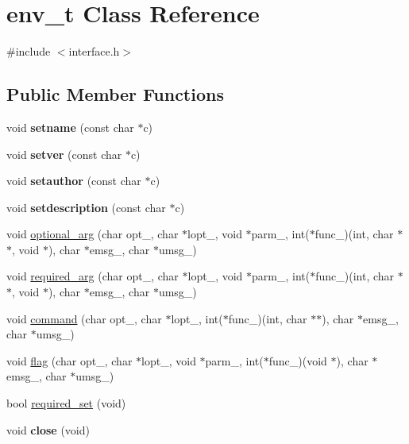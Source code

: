 \hypertarget{classenv__t}{\section{env\-\_\-t Class Reference}
\label{classenv__t}
}


{\ttfamily \#include $<$interface.\-h$>$}

\subsection*{Public Member Functions}
\begin{DoxyCompactItemize}
\item 
\hypertarget{classenv__t_a4a79bfddbd1a307bda6be045e3655c14}{void {\bfseries setname} (const char $\ast$c)}\label{classenv__t_a4a79bfddbd1a307bda6be045e3655c14}

\item 
\hypertarget{classenv__t_a938aa066c5816d3fff2c7ff725af7ab4}{void {\bfseries setver} (const char $\ast$c)}\label{classenv__t_a938aa066c5816d3fff2c7ff725af7ab4}

\item 
\hypertarget{classenv__t_a741fe145876764a54ee00be73ffc0b9b}{void {\bfseries setauthor} (const char $\ast$c)}\label{classenv__t_a741fe145876764a54ee00be73ffc0b9b}

\item 
\hypertarget{classenv__t_aa8248adb6bb538f9db08710cadf41c62}{void {\bfseries setdescription} (const char $\ast$c)}\label{classenv__t_aa8248adb6bb538f9db08710cadf41c62}

\item 
void \hyperlink{classenv__t_a1a0bc45f5fab86f92ec1d9e64865c144}{optional\-\_\-arg} (char opt\-\_\-, char $\ast$lopt\-\_\-, void $\ast$parm\-\_\-, int($\ast$func\-\_\-)(int, char $\ast$$\ast$, void $\ast$), char $\ast$emsg\-\_\-, char $\ast$umsg\-\_\-)
\item 
void \hyperlink{classenv__t_afc6a2cf8967c4396780eccf8e9e3133c}{required\-\_\-arg} (char opt\-\_\-, char $\ast$lopt\-\_\-, void $\ast$parm\-\_\-, int($\ast$func\-\_\-)(int, char $\ast$$\ast$, void $\ast$), char $\ast$emsg\-\_\-, char $\ast$umsg\-\_\-)
\item 
void \hyperlink{classenv__t_a9f3138b6b234353c3167e00f0d19f48d}{command} (char opt\-\_\-, char $\ast$lopt\-\_\-, int($\ast$func\-\_\-)(int, char $\ast$$\ast$), char $\ast$emsg\-\_\-, char $\ast$umsg\-\_\-)
\item 
void \hyperlink{classenv__t_a32619a9a5d586b4ec83546e7b08ca7ad}{flag} (char opt\-\_\-, char $\ast$lopt\-\_\-, void $\ast$parm\-\_\-, int($\ast$func\-\_\-)(void $\ast$), char $\ast$emsg\-\_\-, char $\ast$umsg\-\_\-)
\item 
bool \hyperlink{classenv__t_a3ffef5fa59368ad8d501ccd6ea5073f8}{required\-\_\-set} (void)
\item 
\hypertarget{classenv__t_a44de80882f3d78e5848e9f59290de2a9}{void {\bfseries close} (void)}\label{classenv__t_a44de80882f3d78e5848e9f59290de2a9}

\end{DoxyCompactItemize}
